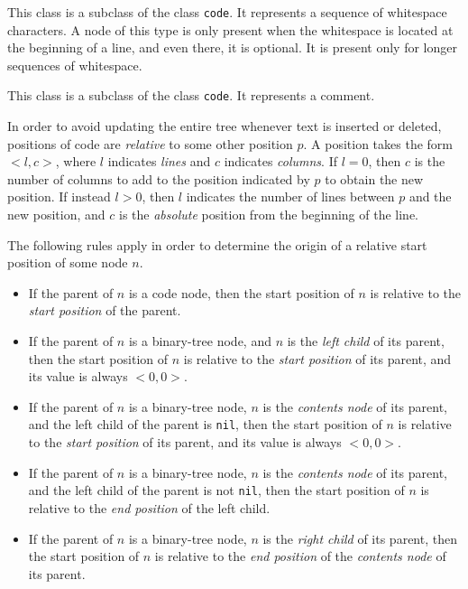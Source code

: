 
This class is a subclass of the class \texttt{code}.  It represents a
sequence of whitespace characters.  A node of this type is only
present when the whitespace is located at the beginning of a line, and
even there, it is optional.  It is present only for longer sequences
of whitespace.


This class is a subclass of the class \texttt{code}.  It represents a
\commonlisp{} comment.

In order to avoid updating the entire tree whenever text is inserted
or deleted, positions of code are \emph{relative} to some other
position $p$.  A position takes the form $<l,c>$, where $l$ indicates
\emph{lines} and $c$ indicates \emph{columns}.  If $l = 0$, then $c$
is the number of columns to add to the position indicated by $p$ to
obtain the new position.  If instead $l > 0$, then $l$ indicates the
number of lines between $p$ and the new position, and $c$ is the
\emph{absolute} position from the beginning of the line.

The following rules apply in order to determine the origin of a
relative start position of some node $n$.

\begin{itemize}
\item If the parent of $n$ is a code node, then the start position of
  $n$ is relative to the \emph{start position} of the parent.
\item If the parent of $n$ is a binary-tree node, and $n$ is the
  \emph{left child} of its parent, then the start position of $n$ is
  relative to the \emph{start position} of its parent, and its value is
  always $<0,0>$.
\item If the parent of $n$ is a binary-tree node, $n$ is the
  \emph{contents node} of its parent, and the left child of the parent
  is \texttt{nil}, then the start position of $n$ is relative to the
  \emph{start position} of its parent, and its value is always
  $<0,0>$.
\item If the parent of $n$ is a binary-tree node, $n$ is the
  \emph{contents node} of its parent, and the left child of the parent
  is not \texttt{nil}, then the start position of $n$ is relative to
  the \emph{end position} of the left child.
\item If the parent of $n$ is a binary-tree node, $n$ is the
  \emph{right child} of its parent, then the start position of $n$ is
  relative to the \emph{end position} of the \emph{contents node} of
  its parent.
\end{itemize}

